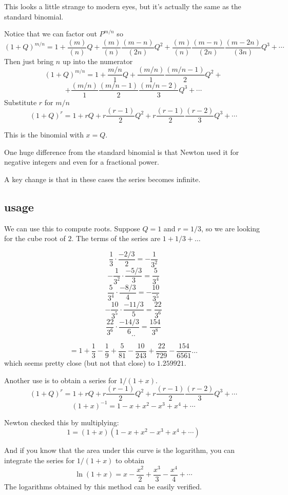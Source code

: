 \documentclass[11pt, oneside]{article}
\begin{document}
This looks a little strange to modern eyes, but it's actually the same as the standard binomial. 

Notice that we can factor out $P^{m/n}$ so
\[ (1 + Q)^{m/n} = 1 + \frac{(m)}{(n)} Q  + \frac{(m)}{(n)} \frac{(m-n)}{(2n)} Q^2 + \frac{(m)}{(n)} \frac{(m-n)}{(2n)} \frac{(m-2n)}{(3n)} Q^3 + \cdots \] 
Then just bring $n$ up into the numerator
\[ (1 + Q)^{m/n} = 1 + \frac{m/n}{1} Q  + \frac{(m/n)}{1} \frac{(m/n-1)}{2} Q^2 + \]
\[ + \frac{(m/n)}{1} \frac{(m/n-1)}{2} \frac{(m/n-2)}{3} Q^3 + \cdots \] 
Substitute $r$ for $m/n$
\[ (1 + Q)^r = 1 + r Q  + r \frac{(r-1)}{2} Q^2 + r \frac{(r-1)}{2} \frac{(r-2)}{3} Q^3 + \cdots \] 

This is the binomial with $x = Q$.

One huge difference from the standard binomial is that Newton used it for negative integers and even for a fractional power.  

A key change is that in these cases the series becomes infinite.

\subsection*{usage}
We can use this to compute roots.  Suppose $Q = 1$ and $r = 1/3$, so we are looking for the cube root of $2$.  The terms of the series are $1 + 1/3 + \dots$

\[ \frac{1}{3} \cdot \frac{-2/3}{2} = - \frac{1}{3^2} \]
\[ - \frac{1}{3^2} \cdot \frac{-5/3}{3} = \frac{5}{3^4} \]
\[  \frac{5}{3^4} \cdot \frac{-8/3}{4} = -\frac{10}{3^5} \]
\[ -\frac{10}{3^5} \cdot \frac{-11/3}{5} = \frac{22}{3^6} \]
\[  \frac{22}{3^6} \cdot \frac{-14/3}{6} = \frac{154}{3^8} \]
\[ .. \]


\[ = 1 + \frac{1}{3} - \frac{1}{9} + \frac{5}{81} - \frac{10}{243} + \frac{22}{729} - \frac{154}{6561} \dots  \]
which seems pretty close (but not that close) to $1.259921$.

Another use is to obtain a series for $1/(1+x)$.
\[ (1 + Q)^r = 1 + rQ + r\frac{(r-1)}{2}Q^2 + r\frac{(r-1)}{2}\frac{(r-2)}{3}Q^3 + \cdots \]
\[ (1+x)^{-1} = 1 - x + x^2 - x^3 + x^4 + \cdots  \]

Newton checked this by multiplying:
\[ 1 = (1+x)(1 - x + x^2 - x^3 + x^4 + \cdots)  \]

And if you know that the area under this curve is the logarithm, you can integrate the series for $1/(1+x)$ to obtain
\[ \ln(1+x) = x - \frac{x^2}{2} + \frac{x^3}{3} - \frac{x^4}{4} + \cdots \]
The logarithms obtained by this method can be easily verified.
\end{document}
